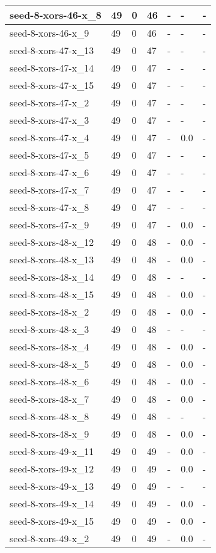 \begin{scriptsize}
\begin{longtable}{|p{5cm}|l|l|l|l|l|l|}
seed-8-xors-46-x\_8&49&0&46&-&-&- \\ \hline 
seed-8-xors-46-x\_9&49&0&46&-&-&- \\ \hline 
seed-8-xors-47-x\_13&49&0&47&-&-&- \\ \hline 
seed-8-xors-47-x\_14&49&0&47&-&-&- \\ \hline 
seed-8-xors-47-x\_15&49&0&47&-&-&- \\ \hline 
seed-8-xors-47-x\_2&49&0&47&-&-&- \\ \hline 
seed-8-xors-47-x\_3&49&0&47&-&-&- \\ \hline 
seed-8-xors-47-x\_4&49&0&47&-&0.0&- \\ \hline 
seed-8-xors-47-x\_5&49&0&47&-&-&- \\ \hline 
seed-8-xors-47-x\_6&49&0&47&-&-&- \\ \hline 
seed-8-xors-47-x\_7&49&0&47&-&-&- \\ \hline 
seed-8-xors-47-x\_8&49&0&47&-&-&- \\ \hline 
seed-8-xors-47-x\_9&49&0&47&-&0.0&- \\ \hline 
seed-8-xors-48-x\_12&49&0&48&-&0.0&- \\ \hline 
seed-8-xors-48-x\_13&49&0&48&-&0.0&- \\ \hline 
seed-8-xors-48-x\_14&49&0&48&-&-&- \\ \hline 
seed-8-xors-48-x\_15&49&0&48&-&0.0&- \\ \hline 
seed-8-xors-48-x\_2&49&0&48&-&0.0&- \\ \hline 
seed-8-xors-48-x\_3&49&0&48&-&-&- \\ \hline 
seed-8-xors-48-x\_4&49&0&48&-&0.0&- \\ \hline 
seed-8-xors-48-x\_5&49&0&48&-&0.0&- \\ \hline 
seed-8-xors-48-x\_6&49&0&48&-&0.0&- \\ \hline 
seed-8-xors-48-x\_7&49&0&48&-&0.0&- \\ \hline 
seed-8-xors-48-x\_8&49&0&48&-&-&- \\ \hline 
seed-8-xors-48-x\_9&49&0&48&-&0.0&- \\ \hline 
seed-8-xors-49-x\_11&49&0&49&-&0.0&- \\ \hline 
seed-8-xors-49-x\_12&49&0&49&-&0.0&- \\ \hline 
seed-8-xors-49-x\_13&49&0&49&-&-&- \\ \hline 
seed-8-xors-49-x\_14&49&0&49&-&0.0&- \\ \hline 
seed-8-xors-49-x\_15&49&0&49&-&0.0&- \\ \hline 
seed-8-xors-49-x\_2&49&0&49&-&0.0&- \\ \hline 

\end{longtable}
\end{scriptsize}
